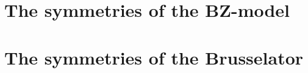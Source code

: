 \documentclass[12pt]{article}
\theoremstyle{definition}
\theoremstyle{remark}
\begin{document}
\section{The symmetries of the BZ-model}

% 
\section{The symmetries of the Brusselator}

\clearpage


\end{document}
